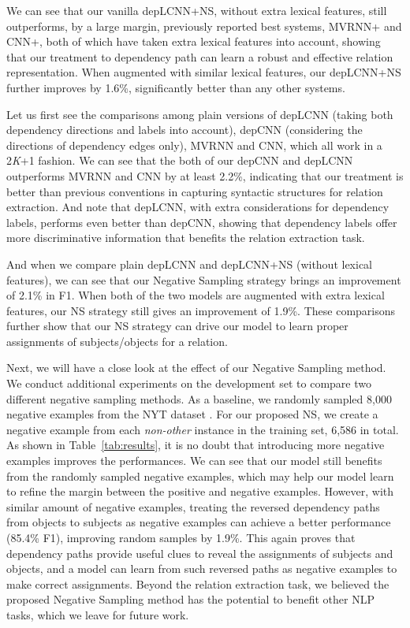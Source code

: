 \documentclass[11pt,a4paper]{article}
\begin{document}
We can see that  our vanilla depLCNN+NS, without extra lexical features, still outperforms, by a large margin, previously 
reported best systems, MVRNN+ and CNN+, both of which have taken extra lexical features into account, showing
that our treatment to dependency path can learn a robust and effective relation representation.  
 When augmented with similar lexical features, our depLCNN+NS further improves by 1.6\%, significantly better than 
any other systems. 


Let us first see the comparisons among plain versions of depLCNN (taking both dependency directions and labels into account),
 depCNN (considering the directions of dependency edges only), MVRNN and CNN, which all work in a 2\textit{K}+1 fashion.
We can see that the both of our depCNN and depLCNN outperforms MVRNN and CNN by at least 2.2\%, 
indicating that our treatment  is better than previous conventions in capturing syntactic structures for relation extraction.
And note that depLCNN, with extra considerations for dependency labels, performs even better than depCNN,  
showing that dependency labels offer more discriminative information that benefits  the relation extraction task.



And when we compare plain depLCNN and depLCNN+NS (without lexical features), 
we can see that our Negative Sampling strategy brings an improvement of 2.1\% in F1. When both of the two models
are augmented with extra lexical features, our NS strategy still gives an improvement of 1.9\%.
 These comparisons further show that  our NS strategy can drive our model to learn proper assignments of subjects/objects 
for a relation. 

Next, we will have a close look at the effect of our Negative Sampling method.
We conduct additional experiments on the development set to compare two different negative sampling methods. As a baseline, we randomly sampled 
8,000 negative examples from the NYT dataset \cite{DBLP:conf/acl/ChenFHQZ14}. 
For our proposed NS, we create a negative example from each \textit{non-other} instance in the training set, 6,586 in total. 
As shown in Table~\ref{tab:results}, it is no doubt that introducing more negative examples improves the performances.
 We can see that our model still benefits from the randomly sampled negative examples, which may help our model learn to refine the margin between the positive and negative examples. 
However, with similar amount of negative examples, treating the reversed dependency paths from objects to subjects as negative examples can achieve a better performance (85.4\% F1), improving random samples by 1.9\%. This again proves that dependency paths provide useful clues  to 
reveal the assignments of subjects and objects, and a model can learn  from such reversed paths as negative examples to make correct assignments.
Beyond the relation extraction task, we believed the proposed Negative Sampling method has the potential to benefit other NLP tasks, which we leave for future work.
\end{document}
